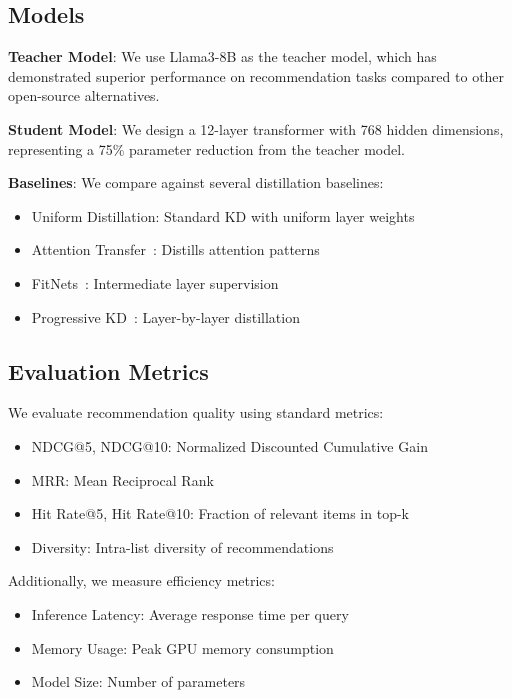 \documentclass[10pt,conference]{IEEEtran}
\begin{document}
\subsection{Models}

\textbf{Teacher Model}: We use Llama3-8B as the teacher model, which has demonstrated superior performance on recommendation tasks compared to other open-source alternatives.

\textbf{Student Model}: We design a 12-layer transformer with 768 hidden dimensions, representing a 75\% parameter reduction from the teacher model.

\textbf{Baselines}: We compare against several distillation baselines:
\begin{itemize}
    \item Uniform Distillation: Standard KD with uniform layer weights
    \item Attention Transfer~\cite{zagoruyko2016attention}: Distills attention patterns
    \item FitNets~\cite{romero2014fitnets}: Intermediate layer supervision
    \item Progressive KD~\cite{sun2019patient}: Layer-by-layer distillation
\end{itemize}

\subsection{Evaluation Metrics}

We evaluate recommendation quality using standard metrics:
\begin{itemize}
    \item NDCG@5, NDCG@10: Normalized Discounted Cumulative Gain
    \item MRR: Mean Reciprocal Rank
    \item Hit Rate@5, Hit Rate@10: Fraction of relevant items in top-k
    \item Diversity: Intra-list diversity of recommendations
\end{itemize}

Additionally, we measure efficiency metrics:
\begin{itemize}
    \item Inference Latency: Average response time per query
    \item Memory Usage: Peak GPU memory consumption
    \item Model Size: Number of parameters
\end{itemize}
\end{document}
